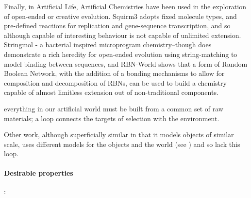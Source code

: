 Finally, in Artificial Life, Artificial Chemistries have been used in
the exploration of open-ended or creative evolution. Squirm3
\autocite{Hutton2009,Lucht2012,Hutton2002} adopts fixed molecule types,
and pre-defined reactions for replication and gene-sequence
transcription, and so although capable of interesting behaviour is not
capable of unlimited extension. Stringmol \autocite{Hickinbotham2011} -
a bacterial inspired microprogram chemistry--though does demonstrate a
rich heredity for open-ended evolution using string-matching to model
binding between sequences, and RBN-World \autocite{Faulconbridge2011}
shows that a form of Random Boolean Network, with the addition of a
bonding mechanisms to allow for composition and decomposition of RBNs,
can be used to build a chemistry capable of almost limitless extension
out of non-traditional components.

everything in our artificial world must be built from a common set of
raw materials; a loop connects the targets of selection with the
environment.

Other work, although superficially similar in that it models objects of
similar scale, uses different models for the objects and the world (see
\autocite{Sanchez-Dehesa:2008uq}) and so lack this loop.

{\autocite{Dorin:2006fk}}

\paragraph{Desirable properties}\label{desirable-properties}

\autocite{Suzuki2003}:

